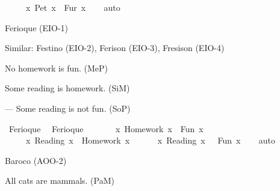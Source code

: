 \begin{isabellebody}
\begin{exercise}[subtitle=Silogizmi]
\ \ \ \ {\isacharparenleft}{\kern0pt}{\isasymexists}\ x{\isachardot}{\kern0pt}\ Pet\ x\ {\isasymand}\ Fur\ x{\isacharparenright}{\kern0pt}{\isachardoublequoteclose}\isanewline
%
\isadelimproof
\ \ %
\endisadelimproof
%
\isatagproof
{}\isamarkupfalse%
\ auto%
\endisatagproof
{\isafoldproof}%
%
\isadelimproof
%
\endisadelimproof
%
\begin{isamarkuptext}%
Ferioque (EIO-1)%
\end{isamarkuptext}\isamarkuptrue%
%
\begin{isamarkuptext}%
Similar: Festino (EIO-2), Ferison (EIO-3), Fresison (EIO-4)%
\end{isamarkuptext}\isamarkuptrue%
%
\begin{isamarkuptext}%
No homework is fun. (MeP)%
\end{isamarkuptext}\isamarkuptrue%
%
\begin{isamarkuptext}%
Some reading is homework. (SiM)%
\end{isamarkuptext}\isamarkuptrue%
%
\begin{isamarkuptext}%
— Some reading is not fun. (SoP)%
\end{isamarkuptext}\isamarkuptrue%
\isamarkupfalse%
\ Ferioque{\isacharcolon}{\kern0pt}\ %
\isadelimproof
%
\endisadelimproof
%
\isatagproof
%
\endisatagproof
{\isafoldproof}%
%
\isadelimproof
\isanewline
%
\endisadelimproof
{}\isamarkupfalse%
\ Ferioque{\isacharcolon}{\kern0pt}\ {\isachardoublequoteopen}\isanewline
\ \ \ \ {\isacharparenleft}{\kern0pt}{\isasymnot}\ {\isacharparenleft}{\kern0pt}{\isasymexists}\ x{\isachardot}{\kern0pt}\ Homework\ x\ {\isasymlongrightarrow}\ Fun\ x{\isacharparenright}{\kern0pt}{\isacharparenright}{\kern0pt}\ {\isasymand}\isanewline
\ \ \ \ {\isacharparenleft}{\kern0pt}{\isasymexists}\ x{\isachardot}{\kern0pt}\ Reading\ x\ {\isasymand}\ Homework\ x{\isacharparenright}{\kern0pt}\ {\isasymlongrightarrow}\isanewline
\ \ \ \ {\isacharparenleft}{\kern0pt}{\isasymexists}\ x{\isachardot}{\kern0pt}\ Reading\ x\ {\isasymand}\ {\isasymnot}\ Fun\ x{\isacharparenright}{\kern0pt}{\isachardoublequoteclose}\isanewline
%
\isadelimproof
\ \ %
\endisadelimproof
%
\isatagproof
{}\isamarkupfalse%
\ auto%
\endisatagproof
{\isafoldproof}%
%
\isadelimproof
%
\endisadelimproof
%
\begin{isamarkuptext}%
Baroco (AOO-2)%
\end{isamarkuptext}\isamarkuptrue%
%
\begin{isamarkuptext}%
All cats are mammals. (PaM)%
\end{isamarkuptext}\isamarkuptrue%

\end{exercise}
\end{isabellebody}
